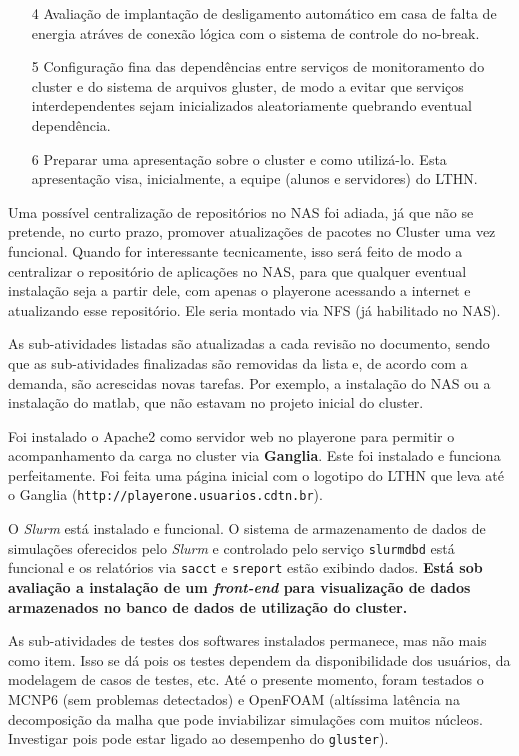 \begin{itemize}
	\item[4] Avaliação de implantação de desligamento automático em casa de falta de energia atráves de conexão lógica com o sistema de controle do no-break.
	\item[5] Configuração fina das dependências entre serviços de monitoramento 
	do cluster e do sistema de arquivos gluster, de modo a evitar que serviços 
	interdependentes sejam inicializados aleatoriamente quebrando eventual 
	dependência.
	\item[6] Preparar uma apresentação sobre o cluster e como utilizá-lo. Esta apresentação visa, inicialmente, a equipe (alunos e servidores) do LTHN.
\end{itemize}

Uma possível centralização de repositórios no NAS foi adiada, já que não se pretende, no curto prazo, promover atualizações de pacotes no Cluster uma vez 
funcional. Quando for interessante tecnicamente, isso será feito de modo a centralizar o repositório de aplicações no NAS, para que qualquer eventual instalação seja a partir dele, com apenas o playerone acessando a internet e atualizando esse repositório. Ele seria montado via NFS (já habilitado no NAS).

As sub-atividades listadas são atualizadas a cada revisão no documento, sendo que 
as sub-atividades finalizadas são removidas da lista e, de acordo com a demanda, 
são acrescidas novas tarefas. Por exemplo, a instalação do NAS ou a instalação do 
matlab, que não estavam no projeto inicial do cluster.

Foi instalado o Apache2 como servidor web no playerone para permitir o acompanhamento da carga no cluster via \textbf{Ganglia}. Este foi instalado 
e funciona perfeitamente. Foi feita uma página inicial com o logotipo do LTHN 
que leva até o Ganglia (\texttt{http://playerone.usuarios.cdtn.br}).

O \textit{Slurm} está instalado e funcional. O sistema de armazenamento de dados de simulações oferecidos pelo \textit{Slurm} e controlado pelo serviço \texttt{slurmdbd} está funcional e os relatórios via \texttt{sacct} e \texttt{sreport} estão exibindo dados. \textbf{Está sob avaliação a instalação de um \textit{front-end} para visualização de dados armazenados no banco de dados de utilização do cluster.}

As sub-atividades de testes dos softwares instalados permanece, mas não mais como item. Isso se dá pois os testes dependem da disponibilidade dos usuários, da modelagem de casos de testes, etc. Até o presente momento, foram testados o MCNP6 (sem problemas detectados) e OpenFOAM (altíssima latência na decomposição da malha que pode inviabilizar simulações com muitos núcleos. Investigar pois pode estar ligado ao desempenho do \texttt{gluster}).

